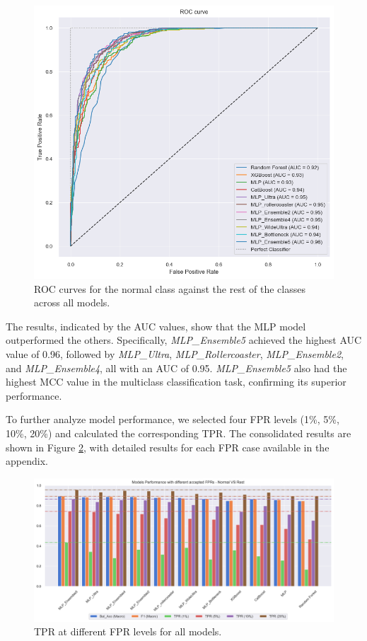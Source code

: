 \begin{figure}[H]
    \centering
    \includegraphics[width=1\columnwidth]{./images/ROC_normVSrest_allmodels.png}
    \caption{ROC curves for the normal class against the rest of the classes across all models.}
    \label{fig:ROC_normVSrest_allmodels}
\end{figure}

The results, indicated by the AUC values, show that the MLP model outperformed the others. 
Specifically, \textit{MLP\_Ensemble5} achieved the highest AUC value of 0.96, followed 
by \textit{MLP\_Ultra}, \textit{MLP\_Rollercoaster}, \textit{MLP\_Ensemble2}, 
and \textit{MLP\_Ensemble4}, all with an AUC of 0.95. \textit{MLP\_Ensemble5} also 
had the highest MCC value in the multiclass classification task, confirming its superior performance.

To further analyze model performance, we selected four FPR levels (1\%, 5\%, 10\%, 20\%) and 
calculated the corresponding TPR. The consolidated results are shown in 
Figure \ref{fig:normVSrest_all}, with detailed results for each FPR case available in the appendix.

\begin{figure}[htpb]
    \centering
    \includegraphics[width=1\textwidth]{./images/nomrVSrest_all.png}
    \caption{TPR at different FPR levels for all models.}
    \label{fig:normVSrest_all}
\end{figure}

